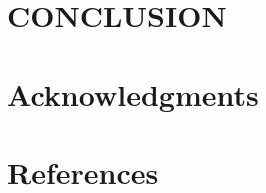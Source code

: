 \documentclass[final,11pt,times]{elsarticle}
\begin{document}
\section{CONCLUSION}
\label{sec:conclusion}



\section*{Acknowledgments}



\section*{References}
\end{document}
